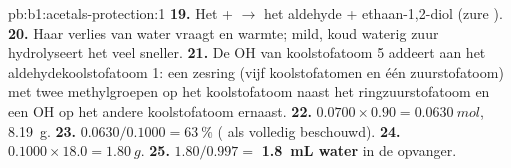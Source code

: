 \begin{solution}{pb:b1:acetals-protection:1}
\textbf{19.} Het  +  $\to$ het aldehyde + ethaan-1,2-diol
(zure ).
\textbf{20.} Haar verlies van water vraagt  en warmte; mild,
koud waterig zuur hydrolyseert het  veel sneller.
\textbf{21.} De OH van koolstofatoom 5 addeert aan het
aldehydekoolstofatoom 1: een zesring (vijf koolstofatomen en één
zuurstofatoom) met twee methylgroepen op het koolstofatoom naast het
ringzuurstofatoom en een OH op het andere koolstofatoom ernaast.
\textbf{22.} $0.0700 \times 0.90 = \qty{0.0630}{mol}$, \qty{8.19}{g}.
\textbf{23.} $0.0630/0.1000 = \qty{63}{\percent}$ ( als
volledig beschouwd).
\textbf{24.} $0.1000 \times 18.0 = \qty{1.80}{g}$.
\textbf{25.} $1.80/0.997 =$ \textbf{\qty{1.8}{mL} water} in de opvanger.
\end{solution}
